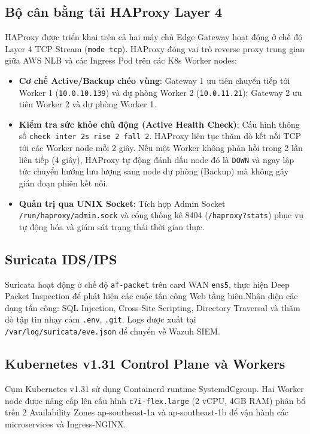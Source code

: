 \subsection{Bộ cân bằng tải HAProxy Layer 4}
HAProxy được triển khai trên cả hai máy chủ Edge Gateway hoạt động ở chế độ Layer 4 TCP Stream (\texttt{mode tcp}). HAProxy đóng vai trò reverse proxy trung gian giữa AWS NLB và các Ingress Pod trên các K8s Worker nodes:
\begin{itemize}
    \item \textbf{Cơ chế Active/Backup chéo vùng}: Gateway 1 ưu tiên chuyển tiếp tới Worker 1 (\texttt{10.0.10.139}) và dự phòng Worker 2 (\texttt{10.0.11.21}); Gateway 2 ưu tiên Worker 2 và dự phòng Worker 1.
    \item \textbf{Kiểm tra sức khỏe chủ động (Active Health Check)}: Cấu hình thông số \texttt{check inter 2s rise 2 fall 2}. HAProxy liên tục thăm dò kết nối TCP tới các Worker node mỗi 2 giây. Nếu một Worker không phản hồi trong 2 lần liên tiếp (4 giây), HAProxy tự động đánh dấu node đó là \texttt{DOWN} và ngay lập tức chuyển hướng lưu lượng sang node dự phòng (Backup) mà không gây gián đoạn phiên kết nối.
    \item \textbf{Quản trị qua UNIX Socket}: Tích hợp Admin Socket \texttt{/run/haproxy/admin.sock} và cổng thống kê 8404 (\texttt{/haproxy?stats}) phục vụ tự động hóa và giám sát trạng thái thời gian thực.
\end{itemize}

\subsection{Suricata IDS/IPS}
Suricata hoạt động ở chế độ \texttt{af-packet} trên card WAN \texttt{ens5}, thực hiện Deep Packet Inspection để phát hiện các cuộc tấn công Web tầng biên.Nhận diện các dạng tấn công: SQL Injection, Cross-Site Scripting, Directory Traversal và thăm dò tập tin nhạy cảm \texttt{.env}, \texttt{.git}. Logs được xuất tại \texttt{/var/log/suricata/eve.json} để chuyển về Wazuh SIEM.

\subsection{Kubernetes v1.31 Control Plane và Workers}
Cụm Kubernetes v1.31 sử dụng Containerd runtime SystemdCgroup. Hai Worker node được nâng cấp lên cấu hình \texttt{c7i-flex.large} (2 vCPU, 4GB RAM) phân bổ trên 2 Availability Zones ap-southeast-1a và ap-southeast-1b để vận hành các microservices và Ingress-NGINX.

